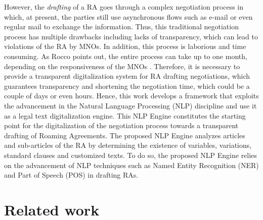 \documentclass[conference]{style/IEEEtran}
\begin{document}
However, the \textit{drafting} of a RA goes through a complex negotiation process in which, at present, the parties still use asynchronous flows such as e-mail or even regular mail to exchange the information. Thus, this traditional negotiation process has multiple drawbacks including lacks of transparency, which can lead to violations of the RA by MNOs. In addition, this process is laborious and time consuming. As Rocco points out, the entire process can take up to one month, depending on the responsiveness of the MNOs \cite{ROCCO2017a}. Therefore, it is necessary to provide a transparent digitalization system for RA drafting negotiations, which guarantees transparency and shortening the negotiation time, which could be a couple of days or even hours. Hence, this work develops a framework that exploits the advancement in the Natural Language Processing (NLP) discipline and use it as a legal text digitalization engine. This NLP Engine constitutes the starting point for the digitalization of the negotiation process towards a transparent drafting of Roaming Agreements. The proposed NLP Engine analyzes articles and sub-articles of the RA by determining the existence of variables, variations, standard clauses and customized texts. To do so, the proposed NLP Engine relies on the advancement of NLP techniques such as Named Entity Recognition (NER) and Part of Speech (POS) in drafting RAs.



\section{Related work}
\end{document}
